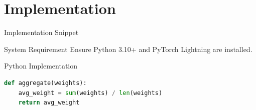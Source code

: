 
\section{Implementation}

\begin{frame}[fragile]{Implementation Snippet}
    \begin{block}{System Requirement}
        Ensure Python 3.10+ and PyTorch Lightning are installed.
    \end{block}

    \begin{exampleblock}{Python Implementation}
    \begin{lstlisting}[language=Python]
def aggregate(weights):
    avg_weight = sum(weights) / len(weights)
    return avg_weight
    \end{lstlisting}
    \end{exampleblock}
\end{frame}
